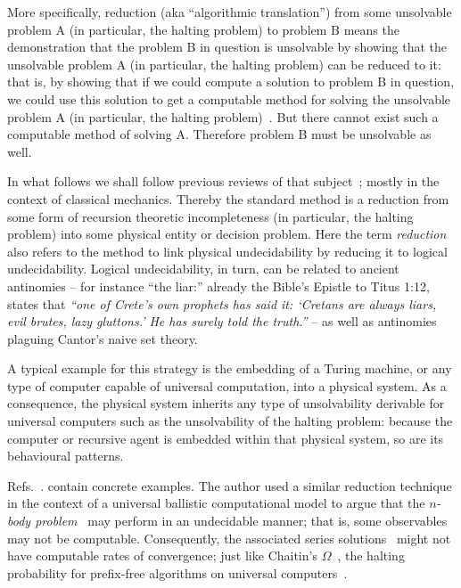 More specifically, reduction (aka ``algorithmic translation'') from some unsolvable problem A (in particular, the halting problem)
to problem B means
the demonstration that the problem B in question
is unsolvable by showing that the unsolvable problem A (in particular, the halting problem) can
be reduced to it:
that is,  by showing that if we could compute a solution to problem B
in question, we could use this solution to get a computable method for solving the
unsolvable problem A (in particular, the halting problem)~\cite[\S~2.1, pp.~34]{rogers1}.
But there cannot exist such a computable method of solving A.
Therefore problem B must be unsolvable as well.


In what follows we shall follow previous reviews  of that subject~\cite{svozil-93,svozil-07-physical_unknowables};
mostly in the context of classical mechanics.
Thereby the standard method is a reduction
from  some form of recursion theoretic incompleteness (in particular, the halting problem)
into some physical entity or decision problem.
Here the term {\em reduction} also refers to the method
to link physical undecidability by reducing it to logical undecidability.
Logical undecidability, in turn, can be related to ancient
antinomies -- for instance ``the liar:''  already the
Bible's Epistle to Titus 1:12, states that
{\em ``one of Crete's own prophets has said it: `Cretans are always liars, evil brutes, lazy gluttons.' He has surely told the truth.''} --
as well as antinomies plaguing Cantor's naive set theory.


A typical example for this strategy is the embedding of a Turing machine, or any type of computer capable of
universal computation, into a physical system.
As a consequence, the physical system inherits
any type of unsolvability derivable for universal computers such as the
unsolvability of the halting problem:
because the computer or recursive agent is embedded within that physical system,
so are its behavioural patterns.

Refs.~\cite{wolfram84,kanter,moore,wolfram85b,dc-d91a,dc-d91b,suppes-1993,svozil-93,1994IJTP...33.1085H,casti:94-onlimits_book,casti:96-onlimits,barrow-impossibilities,Eisert-PhysRevLett.108.260501,cubit-15,cubit-15-marketing}.
contain concrete examples.
The author used a similar reduction technique in the context of a universal ballistic computational model to argue that
the {\em $n$-body problem}~\cite{weierstrass-1885,poincare14,Diacu96-ce}
may perform in an undecidable manner; that is, some observables may not be computable.
Consequently, the associated series solutions~\cite{Sundman12,Wang91,Wang01} might not have computable rates of convergence; just like Chaitin's $\Omega$~\cite{s00032-006-0064-2,chaitin3,rtx100200236p}, the
halting probability for prefix-free algorithms on universal computers~\cite{2002-glimpseofran,calude-dinneen06}.


